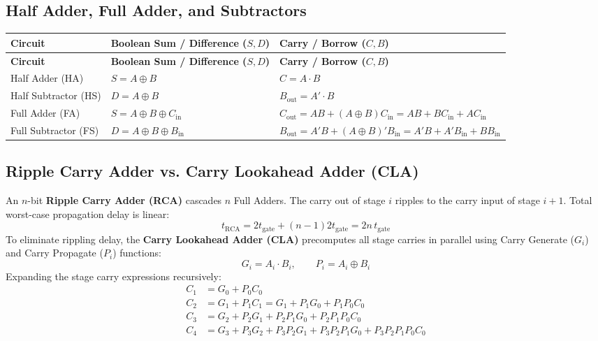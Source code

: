 \documentclass[12pt,a4paper]{article}
\renewcommand{\arraystretch}{1.45}
\begin{document}
\subsection{Half Adder, Full Adder, and Subtractors}
\par\vspace{6pt}\noindent
\begingroup
\setlength{\tabcolsep}{4pt}
\setlength{\extrarowheight}{3pt}
\renewcommand{\arraystretch}{1.35}
\begingroup
\setlength{\LTleft}{0pt}
\setlength{\LTright}{0pt}
\begin{longtable}{|B{2.8cm}|>{\small\raggedright\arraybackslash}m{\dimexpr(\linewidth-2.8cm-6\arrayrulewidth)/2\relax}|>{\small\raggedright\arraybackslash}m{\dimexpr(\linewidth-2.8cm-6\arrayrulewidth)/2\relax}|}
\hline
\textbf{Circuit} & \textbf{Boolean Sum / Difference ($S, D$)} & \textbf{Carry / Borrow ($C, B$)} \\
\hline
\endfirsthead
\hline
\textbf{Circuit} & \textbf{Boolean Sum / Difference ($S, D$)} & \textbf{Carry / Borrow ($C, B$)} \\
\hline
\endhead
Half Adder (HA) & $S = A \oplus B$ & $C = A \cdot B$ \\
\hline
Half Subtractor (HS) & $D = A \oplus B$ & $B_{\text{out}} = A' \cdot B$ \\
\hline
Full Adder (FA) & $S = A \oplus B \oplus C_{\text{in}}$ & $C_{\text{out}} = A B + (A \oplus B) C_{\text{in}} = A B + B C_{\text{in}} + A C_{\text{in}}$ \\
\hline
Full Subtractor (FS) & $D = A \oplus B \oplus B_{\text{in}}$ & $B_{\text{out}} = A' B + (A \oplus B)' B_{\text{in}} = A' B + A' B_{\text{in}} + B B_{\text{in}}$ \\
\hline
\end{longtable}
\endgroup
\endgroup

\subsection{Ripple Carry Adder vs. Carry Lookahead Adder (CLA)}
An $n$-bit \textbf{Ripple Carry Adder (RCA)} cascades $n$ Full Adders. The carry out of stage $i$ ripples to the carry input of stage $i+1$. Total worst-case propagation delay is linear:
\begin{equation}
  t_{\text{RCA}} = 2 t_{\text{gate}} + (n-1) 2 t_{\text{gate}} = 2 n \, t_{\text{gate}}
\end{equation}
To eliminate rippling delay, the \textbf{Carry Lookahead Adder (CLA)} precomputes all stage carries in parallel using Carry Generate ($G_i$) and Carry Propagate ($P_i$) functions:
\begin{equation}
  G_i = A_i \cdot B_i, \qquad P_i = A_i \oplus B_i
\end{equation}
Expanding the stage carry expressions recursively:
\begin{align}
  C_1 &= G_0 + P_0 C_0 \\
  C_2 &= G_1 + P_1 C_1 = G_1 + P_1 G_0 + P_1 P_0 C_0 \\
  C_3 &= G_2 + P_2 G_1 + P_2 P_1 G_0 + P_2 P_1 P_0 C_0 \\
  C_4 &= G_3 + P_3 G_2 + P_3 P_2 G_1 + P_3 P_2 P_1 G_0 + P_3 P_2 P_1 P_0 C_0
\end{align}
\end{document}
